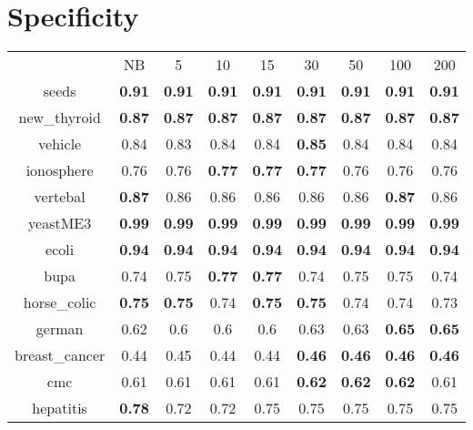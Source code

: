 \documentclass{article}%
\begin{document}
\section*{Specificity}%
\begin{tabular}{c|cccccccc}%

&NB&5&10&15&30&50&100&200\\%

seeds&\textbf{0.91}&\textbf{0.91}&\textbf{0.91}&\textbf{0.91}&\textbf{0.91}&\textbf{0.91}&\textbf{0.91}&\textbf{0.91}\\%

new\_thyroid&\textbf{0.87}&\textbf{0.87}&\textbf{0.87}&\textbf{0.87}&\textbf{0.87}&\textbf{0.87}&\textbf{0.87}&\textbf{0.87}\\%

vehicle&0.84&0.83&0.84&0.84&\textbf{0.85}&0.84&0.84&0.84\\%

ionosphere&0.76&0.76&\textbf{0.77}&\textbf{0.77}&\textbf{0.77}&0.76&0.76&0.76\\%

vertebal&\textbf{0.87}&0.86&0.86&0.86&0.86&0.86&\textbf{0.87}&0.86\\%

yeastME3&\textbf{0.99}&\textbf{0.99}&\textbf{0.99}&\textbf{0.99}&\textbf{0.99}&\textbf{0.99}&\textbf{0.99}&\textbf{0.99}\\%

ecoli&\textbf{0.94}&\textbf{0.94}&\textbf{0.94}&\textbf{0.94}&\textbf{0.94}&\textbf{0.94}&\textbf{0.94}&\textbf{0.94}\\%

bupa&0.74&0.75&\textbf{0.77}&\textbf{0.77}&0.74&0.75&0.75&0.74\\%

horse\_colic&\textbf{0.75}&\textbf{0.75}&0.74&\textbf{0.75}&\textbf{0.75}&0.74&0.74&0.73\\%

german&0.62&0.6&0.6&0.6&0.63&0.63&\textbf{0.65}&\textbf{0.65}\\%

breast\_cancer&0.44&0.45&0.44&0.44&\textbf{0.46}&\textbf{0.46}&\textbf{0.46}&\textbf{0.46}\\%

cmc&0.61&0.61&0.61&0.61&\textbf{0.62}&\textbf{0.62}&\textbf{0.62}&0.61\\%

hepatitis&\textbf{0.78}&0.72&0.72&0.75&0.75&0.75&0.75&0.75\\%


\end{tabular}
\end{document}
